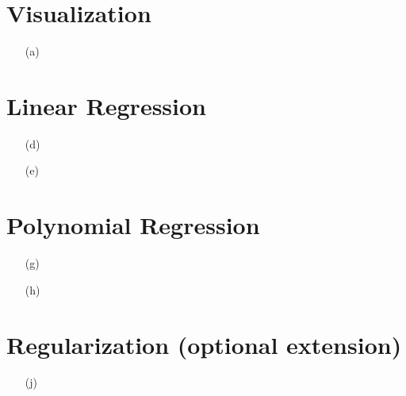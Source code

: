 \documentclass[12pt,letterpaper]{article}
\begin{document}

\section*{Visualization}

\begin{enumerate}

\item[(a)]

\end{enumerate}

\section*{Linear Regression}

\begin{enumerate}

\item[(d)]

\item[(e)]

\end{enumerate}

\section*{Polynomial Regression}

\begin{enumerate}

\item[(g)]

\item[(h)]

\end{enumerate}

\section*{Regularization (optional extension)}

\begin{enumerate}

\item[(j)]

\end{enumerate}
\end{document}

